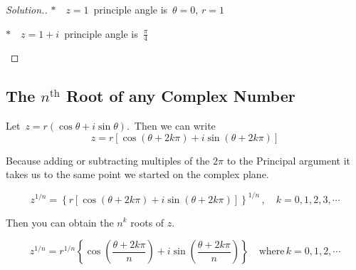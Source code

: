 \documentclass[11pt,a4paper]{article}
\theoremstyle{definition}
\newenvironment{solution}
  {\renewcommand{\qedsymbol}{}\begin{proof}[\textit{Solution}.]}
  {\end{proof}}
\begin{document}
\begin{solution}
$*\quad  z = 1\,$ principle angle is $\, \theta = 0, \, r = 1$


\begin{figure}[H]
\centering
{}
\end{figure}










$*\quad  z = 1 + i\,$ principle angle is $\,\frac{\pi}{4}\qquad $



\begin{figure}[H]
\centering
{}
\end{figure}
\end{solution}
\subsection{The $n^{\text{th}}$ Root of any Complex Number}

Let $\, z = r\left(\cos \theta + i\sin \theta \right).\,$ Then we can write 
$$ z = r\left[\cos \left(\theta + 2k\pi\right) + i \sin \left( \theta + 2k \pi\right) \right]$$

Because adding or subtracting multiples of the $2\pi$ to the Principal argument it takes us to the same point we started on the complex plane.

$$ z^{1/n} = \left\{r\left[\cos \left(\theta + 2k\pi\right) + i \sin \left( \theta + 2k \pi\right) \right]\right\}^{1/n}\,, \quad  k = 0, 1,2,3,\cdots$$

Then you can obtain the $n^k$ roots of $z$.

$$z^{1/n} = r^{1/n} \left\{ \cos\left(\frac{\theta + 2k\pi}{n}\right) + i \sin \left(\frac{\theta + 2k\pi}{n}\right)\right\}\quad \text{where}\, k = 0,1,2,\cdots$$\\
\end{document}
